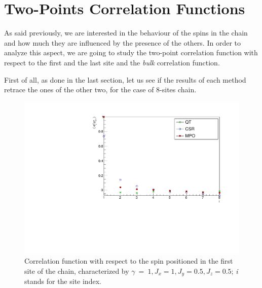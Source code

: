 \section{Two-Points Correlation Functions}
As said previously, we are interested in the behaviour of the spins in the chain and how much they are influenced by the presence of the others. In order to analyze this aspect, we are going to study the two-point correlation function with respect to the first and the last site and the \emph{bulk} correlation function.

First of all, as done in the last section, let us see if the results of each method retrace the ones of the other two, for the case of 8-sites chain. 

\begin{figure}[H]
    \centering
    \includegraphics[scale=0.7]{Figures/8sites_comparison/CorrFunc1_8s_J10505.pdf}
    \caption{Correlation function with respect to the spin positioned in the first site of the chain, characterized by $\gamma~=~1, J_x=1, J_y=0.5, J_z=0.5$; \emph{i} stands for the site index.}
    \label{fig:my_label}
\end{figure}

